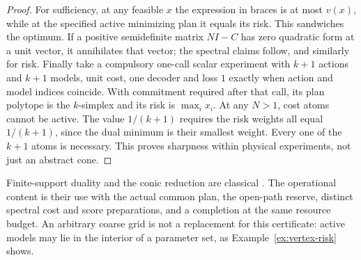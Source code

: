 \begin{proof}
For sufficiency, at any feasible $x$ the expression in braces is at most $v(x)$, while at the specified active minimizing plan it equals its risk. This sandwiches the optimum. If a positive semidefinite matrix $NI-C$ has zero quadratic form at a unit vector, it annihilates that vector; the spectral claims follow, and similarly for risk. Finally take a compulsory one-call scalar experiment with $k+1$ actions and $k+1$ models, unit cost, one decoder and loss $1$ exactly when action and model indices coincide. With commitment required after that call, its plan polytope is the $k$-simplex and its risk is $\max_i x_i$. At any $N>1$, cost atoms cannot be active. The value $1/(k+1)$ requires the risk weights all equal $1/(k+1)$, since the dual minimum is their smallest weight. Every one of the $k+1$ atoms is necessary. This proves sharpness within physical experiments, not just an abstract cone.
\end{proof}

Finite-support duality and the conic reduction are classical \cite[Theorem 4.4]{Shapiro09}. The operational content is their use with the actual common plan, the open-path reserve, distinct spectral cost and score preparations, and a completion at the same resource budget. An arbitrary coarse grid is not a replacement for this certificate: active models may lie in the interior of a parameter set, as Example~\ref{ex:vertex-risk} shows.

